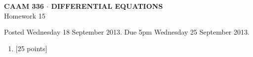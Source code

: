 \documentclass[10pt]{article}
\begin{document}
\vspace*{-5em}
\begin{center}
\large \textsf{\textbf{CAAM 336 $\cdot$ DIFFERENTIAL EQUATIONS}\\[0.5em]
Homework 15 }
\end{center}

Posted Wednesday 18 September 2013. Due 5pm Wednesday 25 September 2013.

\begin{enumerate}\addtocounter{enumi}{14}
\item {[25 points]}\\  

\end{enumerate}
\end{document}
